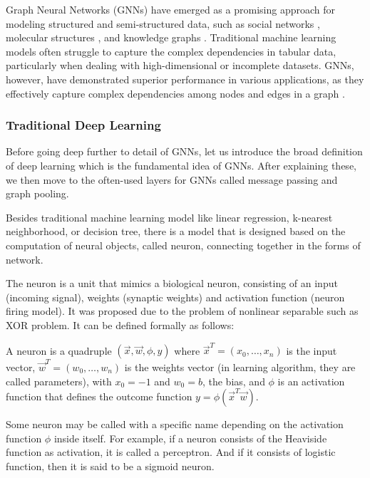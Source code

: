 Graph Neural Networks (GNNs) have emerged as a promising approach for modeling structured and semi-structured data, such as social networks \cite{Zhang2019}, molecular structures \cite{Gilmer2017}, and knowledge graphs \cite{Schlichtkrull}. Traditional machine learning models often struggle to capture the complex dependencies in tabular data, particularly when dealing with high-dimensional or incomplete datasets. GNNs, however, have demonstrated superior performance in various applications, as they effectively capture complex dependencies among nodes and edges in a graph \cite[Kipf \& Welling 2017]{GCN}.

\subsubsection{Traditional Deep Learning}
Before going deep further to detail of GNNs, let us introduce the broad definition of deep learning which is the fundamental idea of GNNs. After explaining these, we then move to the often-used layers for GNNs called message passing and graph pooling.

Besides traditional machine learning model like linear regression, k-nearest neighborhood, or decision tree, there is a model that is designed based on the computation of neural objects, called neuron, connecting together in the forms of network.

The neuron is a unit that mimics a biological neuron, consisting of an input (incoming signal), weights (synaptic weights) and activation function (neuron firing model).
It was proposed due to the problem of nonlinear separable such as XOR problem.
It can be defined formally as follows:

\begin{defi}[Neuron]
	A neuron is a quadruple $(\vec{x}, \vec{w}, \phi, y)$ where $\vec{x}^T = (x_0,\dots,x_n)$ is the input vector, $\vec{w}^T = (w_0,\dots, w_n)$ is the weights vector (in learning algorithm, they are called parameters), with $x_0=-1$ and $w_0=b$, the bias, and $\phi$ is an activation function that defines the outcome function $y=\phi(\vec{x}^T\vec{w})$.
\end{defi}

\noindent Some neuron may be called with a specific name depending on the activation function $\phi$ inside itself.
For example, if a neuron consists of the Heaviside function as activation, it is called a perceptron.
And if it consists of logistic function, then it is said to be a sigmoid neuron.

